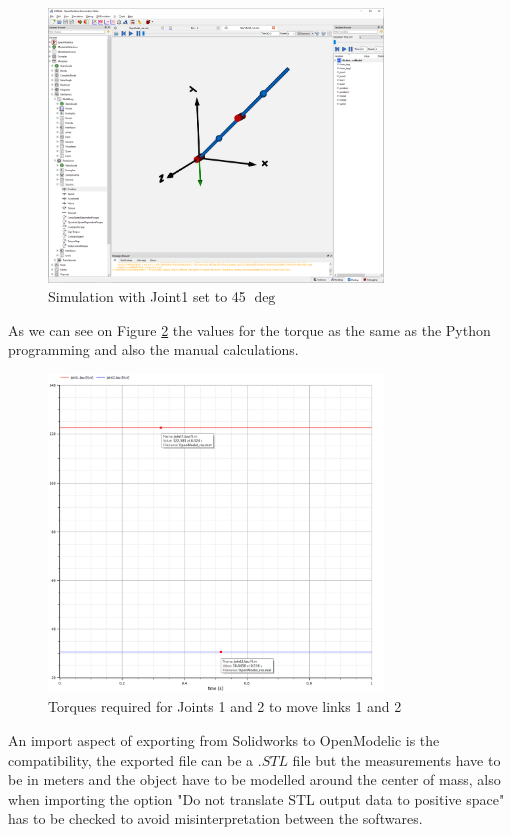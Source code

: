 \documentclass[transmag]{IEEEtran}
\begin{document}
\begin{figure}
\centerline{\includegraphics[width=3.5in]{./images/Joint145Joint20}}
\caption{Simulation with Joint1 set to 45 $\deg$\label{fig7}}
\end{figure}

As we can see on Figure \ref{fig8} the values for the torque as the same as the Python programming and also the manual calculations.

\begin{figure}
\centerline{\includegraphics[width=3.5in]{./images/taus}}
\caption{Torques required for Joints 1 and 2 to move links 1 and 2\label{fig8}}
\end{figure}

An import aspect of exporting from Solidworks to OpenModelic is the compatibility, the exported file can be a $.STL$ file but the measurements have to be in meters and the object have to be modelled around the center of mass, also when importing the option "Do not translate STL output data to positive space" has to be checked to avoid misinterpretation between the softwares.
\end{document}
